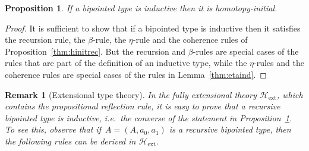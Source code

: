 \documentclass[10pt,a4paper,oneside,reqno]{amsart}
\numberwithin{equation}{section}
\theoremstyle{mythm}
\newtheorem{proposition}[theorem]{Proposition}
\theoremstyle{mydef}
\theoremstyle{myrmk}
\newtheorem*{remark*}{Remark}
\newcommand{\Hext}{\mathcal{H}_{\mathrm{ext}}}
\begin{document}
\begin{proposition} \label{thm:indrec}
If a bipointed type is inductive then it is homotopy-initial.
\end{proposition}


\begin{proof} It is sufficient to
show that if a bipointed type is inductive then it satisfies the recursion rule, the $\beta$-rule, the $\eta$-rule and the
coherence rules of Proposition~\ref{thm:hinitrec}. But the recursion and $\beta$-rules are special cases of the rules that are part of the definition of an inductive type, while the $\eta$-rules and the coherence rules are special cases of the rules in Lemma~\ref{thm:etaind}. 
\end{proof}



\begin{remark*}[Extensional type theory]  \label{thm:extbip} In the fully extensional theory $\Hext$, which contains the 
propositional reflection rule, it is easy to prove that a recursive bipointed type  is inductive, i.e.\ the converse of the statement in Proposition~\ref{thm:indrec}. To see this,
observe that if~$A = (A, a_0, a_1)$ is a recursive bipointed type, then the following rules can be derived in
$\Hext$. \\[1ex]


\end{remark*}
\end{document}
